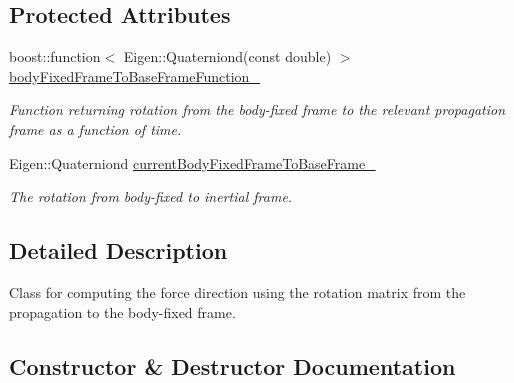 \subsection*{Protected Attributes}
\begin{DoxyCompactItemize}
\item 
boost\+::function$<$ Eigen\+::\+Quaterniond(const double) $>$ \hyperlink{classtudat_1_1propulsion_1_1OrientationBasedForceGuidance_af71a32341bb9cb1a138263d407c1f431}{body\+Fixed\+Frame\+To\+Base\+Frame\+Function\+\_\+}\hypertarget{classtudat_1_1propulsion_1_1OrientationBasedForceGuidance_af71a32341bb9cb1a138263d407c1f431}{}\label{classtudat_1_1propulsion_1_1OrientationBasedForceGuidance_af71a32341bb9cb1a138263d407c1f431}

\begin{DoxyCompactList}\small\item\em Function returning rotation from the body-\/fixed frame to the relevant propagation frame as a function of time. \end{DoxyCompactList}\item 
Eigen\+::\+Quaterniond \hyperlink{classtudat_1_1propulsion_1_1OrientationBasedForceGuidance_ad5e40e42563aa2d5a623e3fbf916c3f8}{current\+Body\+Fixed\+Frame\+To\+Base\+Frame\+\_\+}\hypertarget{classtudat_1_1propulsion_1_1OrientationBasedForceGuidance_ad5e40e42563aa2d5a623e3fbf916c3f8}{}\label{classtudat_1_1propulsion_1_1OrientationBasedForceGuidance_ad5e40e42563aa2d5a623e3fbf916c3f8}

\begin{DoxyCompactList}\small\item\em The rotation from body-\/fixed to inertial frame. \end{DoxyCompactList}\end{DoxyCompactItemize}


\subsection{Detailed Description}
Class for computing the force direction using the rotation matrix from the propagation to the body-\/fixed frame. 

\subsection{Constructor \& Destructor Documentation}
